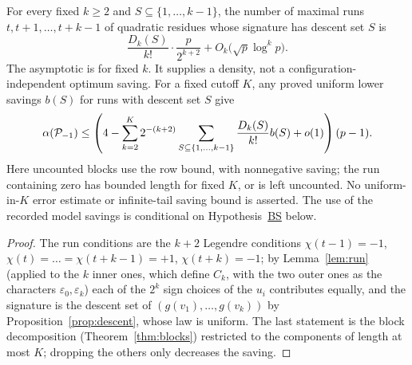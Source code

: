 \begin{corollary}\label{cor:rundensity}
For every fixed $k\ge2$ and $S\subseteq\{1,\dots,k-1\}$, the number of maximal runs $t,t+1,\dots,t+k-1$ of quadratic residues whose
signature has descent set $S$ is
\[
 \frac{D_k(S)}{k!}\cdot\frac p{2^{k+2}}+O_k\bigl(\sqrt p\log^kp\bigr).
\]
The asymptotic is for fixed $k$.  It supplies a density, not a configuration-independent optimum saving.
For a fixed cutoff $K$, any proved uniform lower savings $b(S)$ for runs with descent set $S$ give
\[
 \alpha(\mathcal{P}_{-1})\le\left(4-\sum_{k=2}^K2^{-(k+2)}
 \sum_{S\subseteq\{1,\dots,k-1\}}\frac{D_k(S)}{k!}b(S)+o(1)\right)(p-1).
\]
Here uncounted blocks use the row bound, with nonnegative saving; the run containing zero has bounded length for fixed $K$, or is left uncounted.
No uniform-in-$K$ error estimate or infinite-tail saving bound is asserted.  The use of the recorded model savings is conditional on Hypothesis~\hyperref[hyp:block]{BS} below.
\end{corollary}
\begin{proof}
The run conditions are the $k+2$ Legendre conditions $\chi(t-1)=-1$, $\chi(t)=\dots=\chi(t+k-1)=+1$, $\chi(t+k)=-1$; by Lemma~\ref{lem:run}
(applied to the $k$ inner ones, which define $C_k$, with the two outer ones as the characters $\varepsilon_0,\varepsilon_k$) each of the $2^k$
sign choices of the $u_i$ contributes equally, and the signature is the descent set of $(g(v_1),\dots,g(v_k))$ by
Proposition~\ref{prop:descent}, whose law is uniform.  The last statement is the block decomposition (Theorem~\ref{thm:blocks}) restricted
to the components of length at most $K$; dropping the others only decreases the saving.
\end{proof}
